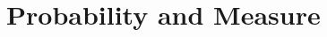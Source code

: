 \documentclass[main.tex]{subfiles}
\begin{document}
	\chapter{Probability and Measure}		
\end{document}
